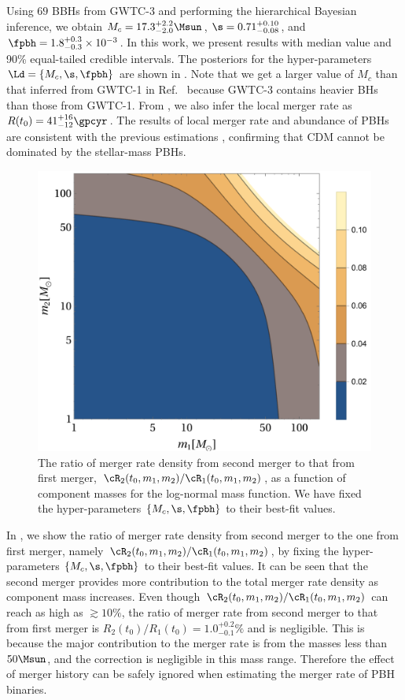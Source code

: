 \documentclass[
reprint,           %
superscriptaddress,%
amsmath,           %
amssymb,           %
aps,               %
prd,               %
notitlepage,       %
longbibliography,  %
floatfix,          %
nofootinbib,
]{revtex4-1}
\begin{document}
Using $69$ BBHs from GWTC-3 and performing the hierarchical Bayesian inference, we obtain $M_c = 17.3^{+2.2}_{-2.0} \Msun$, $\s = 0.71^{+0.10}_{-0.08}$, and $\fpbh = 1.8^{+0.3}_{-0.3} \times 10^{-3}$. In this work, we present results with median value and 90\% equal-tailed credible intervals. The posteriors for the hyper-parameters $\Ld = \{M_c, \s, \fpbh\}$ are shown in . Note that we get a larger value of $M_c$ than that inferred from GWTC-1 in Ref.~\cite{Wu:2020drm} because GWTC-3 contains heavier BHs than those from GWTC-1. From , we also infer the local merger rate as $R(t_0) = 41^{+16}_{-12} \gpcyr$. The results of local merger rate and abundance of PBHs are consistent with the previous estimations \cite{Chen:2018czv,Chen:2018rzo,Chen:2019irf,Wu:2020drm,Chen:2021nxo,Chen:2022fda}, confirming that CDM cannot be dominated by the stellar-mass PBHs.

\begin{figure}[tbp!]
	\centering
	\includegraphics[width=\linewidth]{ratio-log.pdf}
	\caption{\label{ratio-log}The ratio of merger rate density from second merger to that from first merger, $\cR_2(t_0, m_1, m_2)/\cR_1(t_0, m_1, m_2)$, as a function of component masses for the log-normal mass function. We have fixed the hyper-parameters $\{M_c, \s, \fpbh\}$ to their best-fit values.}
\end{figure}


In , we show the ratio of merger rate density from second merger to the one from first merger, namely $\cR_2(t_0, m_1, m_2)/\cR_1(t_0, m_1, m_2)$, by fixing the hyper-parameters $\{M_c, \s, \fpbh\}$ to their best-fit values. It can be seen that the second merger provides more contribution to the total merger rate density as component mass increases. Even though $\cR_2(t_0, m_1, m_2)/\cR_1(t_0, m_1, m_2)$ can reach as high as $\gtrsim 10\%$, the ratio of merger rate from second merger to that from first merger is $R_2(t_0)/R_1(t_0) = 1.0^{+0.2}_{-0.1}\%$ and is negligible. This is because the major contribution to the merger rate is from the masses less than $50\Msun$, and the correction is negligible in this mass range. Therefore the effect of merger history can be safely ignored when estimating the merger rate of PBH binaries.
\end{document}
